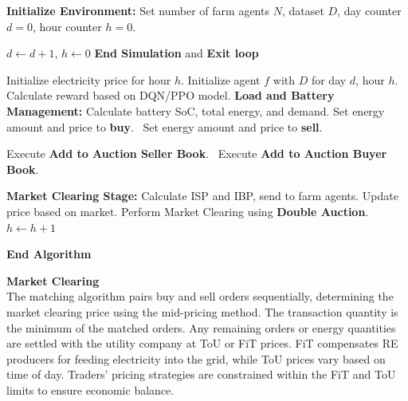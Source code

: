 \documentclass[preprint,12pt]{elsarticle}
\begin{document}
\begin{algorithm}
\caption{MARL MAPDES P2P Energy Trading Simulation}
\label{MARLpseudocode}
\begin{algorithmic}

\State \textbf{Initialize Environment:}
    \State Set number of farm agents $N$, dataset $D$, day counter $d = 0$, hour counter $h = 0$.

 
     
        \State $d \gets d + 1$, $h \gets 0$
    \EndIf
     \textbf{End Simulation} and \textbf{Exit loop} \EndIf

        \State Initialize electricity price for hour $h$.
        \State Initialize agent $f$ with $D$ for day $d$, hour $h$.
        \State Calculate reward based on DQN/PPO model.
        \State \textbf{Load and Battery Management:}
            \State Calculate battery SoC, total energy, and demand.
             Set energy amount and price to \textbf{buy}.
            \Else \ Set energy amount and price to \textbf{sell}.
            \EndIf

         Execute \textbf{Add to Auction Seller Book}.
        \Else \ Execute \textbf{Add to Auction Buyer Book}.
        \EndIf
    \EndFor

    \State \textbf{Market Clearing Stage:}
        \State Calculate ISP and IBP, send to farm agents.
             Update price based on market.
            \EndIf
        \EndFor
        \State Perform Market Clearing using \textbf{Double Auction}.
    \State $h \gets h + 1$ 
\EndWhile

\State \textbf{End Algorithm}
\end{algorithmic}
\end{algorithm}






\textbf{Market Clearing}\\
The matching algorithm pairs buy and sell orders sequentially, determining the market clearing price using the mid-pricing method. The transaction quantity is the minimum of the matched orders. Any remaining orders or energy quantities are settled with the utility company at ToU or FiT prices. FiT compensates RE producers for feeding electricity into the grid, while ToU prices vary based on time of day. Traders' pricing strategies are constrained within the FiT and ToU limits to ensure economic balance.
\end{document}
